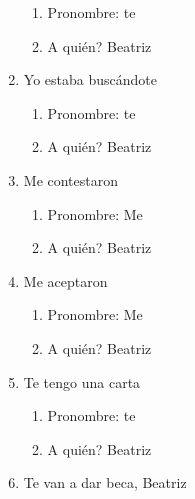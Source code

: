 \documentclass[12pt]{article}
\begin{document}
\begin{enumerate}
\begin{enumerate}
      \item Pronombre: te

      \item A qui\'en? Beatriz

    \end{enumerate}

  \item Yo estaba busc\'andote

    \begin{enumerate}

      \item Pronombre: te

      \item A qui\'en? Beatriz

    \end{enumerate}

  \item Me contestaron

    \begin{enumerate}

      \item Pronombre: Me

      \item A qui\'en? Beatriz

    \end{enumerate}

  \item Me aceptaron

    \begin{enumerate}

      \item Pronombre: Me

      \item A qui\'en? Beatriz

    \end{enumerate}

  \item Te tengo una carta

    \begin{enumerate}

      \item Pronombre: te

      \item A qui\'en? Beatriz

    \end{enumerate}

  \item Te van a dar beca, Beatriz

    \begin{enumerate}


\end{enumerate}
\end{enumerate}
\end{document}
